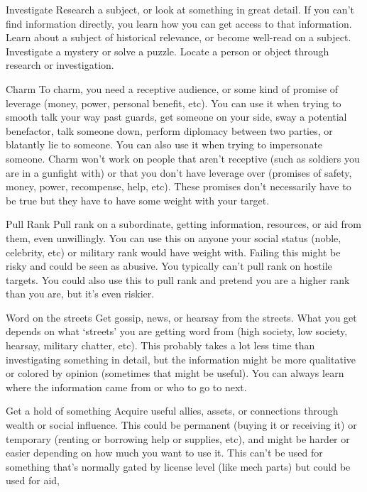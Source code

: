 Investigate  
Research a subject, or look at something in great detail. If you can’t find information directly, you  
learn how you can get access to that information. Learn about a subject of historical relevance, or  
become well-read on a subject. Investigate a mystery or solve a puzzle. Locate a person or object  
through research or investigation.  

Charm   
To charm, you need a receptive audience, or some kind of promise of leverage (money, power,  
personal benefit, etc). You can use it when trying to smooth talk your way past guards, get  
someone on your side, sway a potential benefactor, talk someone down, perform diplomacy  
between two parties, or blatantly lie to someone. You can also use it when trying to impersonate  
someone. Charm won’t work on people that aren’t receptive (such as soldiers you are in a  
gunfight with) or that you don’t have leverage over (promises of safety, money, power,  
recompense, help, etc). These promises don’t necessarily have to be true but they have to have  
some weight with your target.  

Pull Rank  
Pull rank on a subordinate, getting information, resources, or aid from them, even unwillingly. You  
can use this on anyone your social status (noble, celebrity, etc) or military rank would have weight  
with. Failing this might be risky and could be seen as abusive. You typically can’t pull rank on  
hostile targets. You could also use this to pull rank and pretend you are a higher rank than you  
are, but it’s even riskier.  

Word on the streets  
Get gossip, news, or hearsay from the streets. What you get depends on what ‘streets’ you are  
getting word from (high society, low society, hearsay, military chatter, etc). This probably takes a  
lot less time than investigating something in detail, but the information might be more qualitative  
or colored by opinion (sometimes that might be useful). You can always learn where the  
information came from or who to go to next.  

Get a hold of something   
Acquire useful allies, assets, or connections through wealth or social influence. This could be  
permanent (buying it or receiving it) or temporary (renting or borrowing help or supplies, etc), and  
might be harder or easier depending on how much you want to use it. This can’t be used for  
something that’s normally gated by license level (like mech parts) but could be used for aid,  

                                                                                                                    


